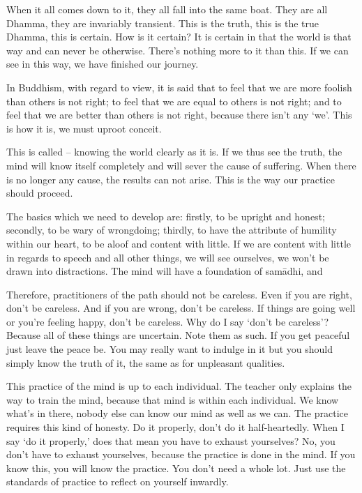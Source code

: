 When it all comes down to it, they all fall into the same boat. They are all Dhamma, they are invariably transient. This is the truth, this is the true Dhamma, this is certain. How is it certain? It is certain in that the world is that way and can never be otherwise. There's nothing more to it than this. If we can see in this way, we have finished our journey.

In Buddhism, with regard to view, it is said that to feel that we are more foolish than others is not right; to feel that we are equal to others is not right; and to feel that we are better than others is not right, because there isn't any `we'. This is how it is, we must uproot conceit.

This is called  -- knowing the world clearly as it is. If we thus see the truth, the mind will know itself completely and will sever the cause of suffering. When there is no longer any cause, the results can not arise. This is the way our practice should proceed.

The basics which we need to develop are: firstly, to be upright and honest; secondly, to be wary of wrongdoing; thirdly, to have the attribute of humility within our heart, to be aloof and content with little. If we are content with little in regards to speech and all other things, we will see ourselves, we won't be drawn into distractions. The mind will have a foundation of  sam\=adhi, and 

Therefore, practitioners of the path should not be careless. Even if you are right, don't be careless. And if you are wrong, don't be careless. If things are going well or you're feeling happy, don't be careless. Why do I say `don't be careless'? Because all of these things are uncertain. Note them as such. If you get peaceful just leave the peace be. You may really want to indulge in it but you should simply know the truth of it, the same as for unpleasant qualities.

This practice of the mind is up to each individual. The teacher only explains the way to train the mind, because that mind is within each individual. We know what's in there, nobody else can know our mind as well as we can. The practice requires this kind of honesty. Do it properly, don't do it half-heartedly. When I say `do it properly,' does that mean you have to exhaust yourselves? No, you don't have to exhaust yourselves, because the practice is done in the mind. If you know this, you will know the practice. You don't need a whole lot. Just use the standards of practice to reflect on yourself inwardly.

